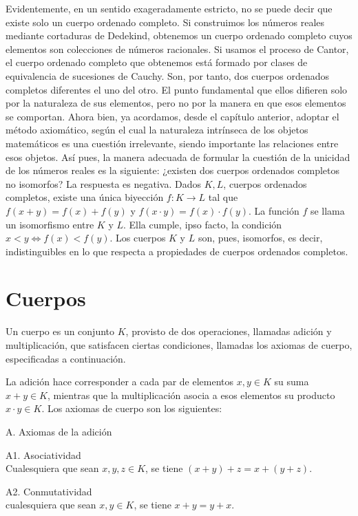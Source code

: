 \documentclass[12pt,oneside]{book}
\begin{document}
Evidentemente, en un sentido exageradamente estricto, no se puede decir que existe solo un cuerpo ordenado completo. Si construimos los números reales mediante cortaduras de Dedekind, obtenemos un cuerpo ordenado completo cuyos elementos son colecciones de números racionales. Si usamos el proceso de Cantor, el cuerpo ordenado completo que obtenemos está formado por clases de equivalencia de sucesiones de Cauchy. Son, por tanto, dos cuerpos ordenados completos diferentes el uno del otro. El punto fundamental que ellos difieren solo por la naturaleza de sus elementos, pero no por la manera en que esos elementos se comportan. Ahora bien, ya acordamos, desde el capítulo anterior, adoptar el método axiomático, según el cual la naturaleza intrínseca de los objetos matemáticos es una cuestión irrelevante, siendo importante las relaciones entre esos objetos. Así pues, la manera adecuada de formular la cuestión de la unicidad de los números reales es la siguiente: ¿existen dos cuerpos ordenados completos no isomorfos? La respuesta es negativa. Dados \(K, L\), cuerpos ordenados completos, existe una única biyección \(f: K \to L\) tal que \(f(x+y) = f(x)+f(y)\) y \(f(x\cdot y) = f(x)\cdot f(y)\). La función \(f\) se llama un isomorfismo entre \(K\) y \(L\). Ella cumple, ipso facto, la condición \(x < y \Leftrightarrow f(x) < f(y)\). Los cuerpos \(K\) y \(L\) son, pues, isomorfos, es decir, indistinguibles en lo que respecta a propiedades de cuerpos ordenados completos.

\section{Cuerpos}

Un cuerpo es un conjunto \(K\), provisto de dos operaciones, llamadas adición y multiplicación, que satisfacen ciertas condiciones, llamadas los axiomas de cuerpo, especificadas a continuación.

La adición hace corresponder a cada par de elementos \(x, y \in K\) su suma \(x + y \in K\), mientras que la multiplicación asocia a esos elementos su producto \(x \cdot y \in K\). Los axiomas de cuerpo son los siguientes:

A. Axiomas de la adición

A1. Asociatividad\\
Cualesquiera que sean \(x, y, z \in K\), se tiene \((x + y) + z = x + (y + z)\).

A2. Conmutatividad\\
cualesquiera que sean \(x, y \in K\), se tiene \(x + y = y + x\).
\end{document}
